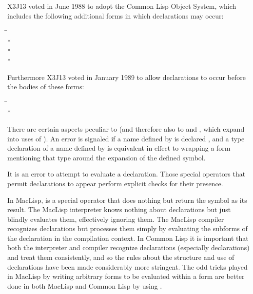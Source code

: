 \begin{defspec}
\begin{new}
X3J13 voted in June 1988
to adopt the Common Lisp Object System,
which includes the following additional forms in which declarations
may occur:
\begin{lisp}
\hskip 12pc\=\kill
{}\> \\*
\> \\*
\> \\*
\end{lisp}
Furthermore X3J13 voted in January 1989
to allow declarations to
occur before the bodies of these forms:
\begin{lisp}
\hskip 12pc\=\kill
{}\> \\*
\end{lisp}
There are certain aspects peculiar to 
(and therefore also to  and ,
which expand into uses of ).
An error is signaled if a name defined by 
is declared , and a type declaration of a name
defined by  is equivalent in effect
to wrapping a  form mentioning that type around
the expansion of the defined symbol.
\end{new}

It is an error to attempt to evaluate a declaration.
Those special operators that permit declarations to appear
perform explicit checks for their presence.

\beforenoterule
\begin{incompatibility}
In MacLisp,  is a special operator
that does nothing but return the symbol  as its
result.  The MacLisp interpreter knows nothing about declarations
but just blindly evaluates them, effectively ignoring them.
The MacLisp compiler recognizes declarations but processes
them simply by evaluating the subforms of the declaration in
the compilation context.  In Common Lisp it is
important that both the interpreter and compiler recognize
declarations (especially  declarations) and treat them
consistently,
and so the rules about the structure and use of declarations
have been made considerably more stringent.
The odd tricks played in MacLisp by writing arbitrary forms
to be evaluated within a  form
are better done in both MacLisp and Common Lisp by using .
\end{incompatibility}
\afternoterule


\end{defspec}
